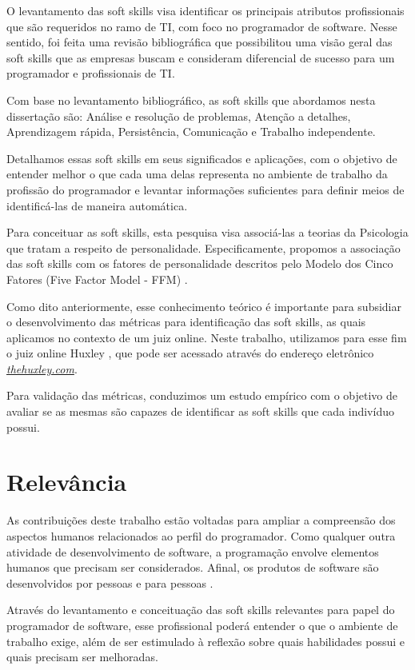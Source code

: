 O levantamento das soft skills visa identificar os principais atributos profissionais que são requeridos no ramo de TI, com foco no programador de software. Nesse sentido, foi feita uma revisão bibliográfica que possibilitou uma visão geral das soft skills que as empresas buscam e consideram diferencial de sucesso para um programador e profissionais de TI.

Com base no levantamento bibliográfico, as soft skills que abordamos nesta dissertação são: Análise e resolução de problemas, Atenção a detalhes, Aprendizagem rápida, Persistência, Comunicação e Trabalho independente. 

Detalhamos essas soft skills em seus significados e aplicações, com o objetivo de entender melhor o que cada uma delas representa no ambiente de trabalho da profissão do programador e levantar informações suficientes para definir meios de identificá-las de maneira automática.

Para conceituar as soft skills, esta pesquisa visa associá-las a teorias da Psicologia que tratam a respeito de personalidade. Especificamente, propomos a associação das soft skills com os fatores de personalidade descritos pelo Modelo dos Cinco Fatores (Five Factor Model - FFM) \cite{mccrae:92}. 

Como dito anteriormente, esse conhecimento teórico é importante para subsidiar o desenvolvimento das métricas para identificação das soft skills, as quais aplicamos no contexto de um juiz online. Neste trabalho, utilizamos para esse fim o juiz online Huxley \cite{paes:13}, que pode ser acessado através do endereço eletrônico \href{thehuxley.com}{\textsl{thehuxley.com}}.

Para validação das métricas, conduzimos um estudo empírico com o objetivo de avaliar se as mesmas são capazes de identificar as soft skills que cada indivíduo possui.

\section{Relevância}

As contribuições deste trabalho estão voltadas para ampliar a compreensão dos aspectos humanos relacionados ao perfil do programador. Como qualquer outra atividade de desenvolvimento de software, a programação envolve elementos humanos que precisam ser considerados. Afinal, os produtos de software são desenvolvidos por pessoas e para pessoas \cite{john:05}.

Através do levantamento e conceituação das soft skills relevantes para papel do programador de software, esse profissional poderá entender o que o ambiente de trabalho exige, além de ser estimulado à reflexão sobre quais habilidades possui e quais precisam ser melhoradas.

